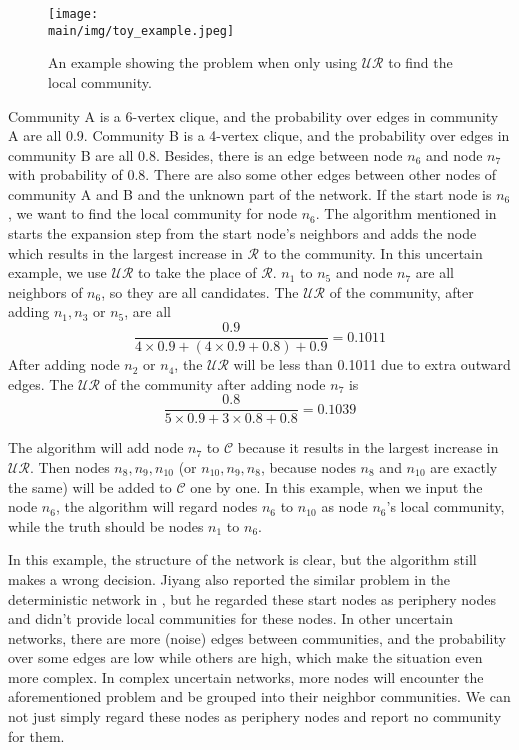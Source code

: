 \documentclass[\main/thesis.tex]{subfiles}
\begin{document}
\begin{figure}
\centering
\texttt{[image: \\main/img/toy\_example.jpeg]}
\caption{An example showing the problem when only using $\mathcal{UR}$ to find the local community.}
\label{problem_example}
\end{figure}

Community A is a 6-vertex clique, and the probability over edges in community A are all 0.9. Community B is a 4-vertex clique, and the probability over edges in community B are all 0.8. Besides, there is an edge between node $n_6$ and node $n_7$ with probability of 0.8. There are also some other edges between other nodes of community A and B and the unknown part of the network. If the start node is $n_6$, we want to find the local community for node $n_6$. The algorithm mentioned in \cite{clauset2005finding,chen2009detecting} starts the expansion step from the start node's neighbors and adds the node which results in the largest increase in $\mathcal{R}$ to the community. In this uncertain example, we use $\mathcal{UR}$ to take the place of $\mathcal{R}$. $n_1$ to $n_5$ and node $n_7$ are all neighbors of $n_6$, so they are all candidates. The $\mathcal{UR}$ of the community, after adding $n_1, n_3$ or $n_5$, are all 
\begin{equation}
\frac{0.9}{4\times0.9+(4\times0.9+0.8)+0.9}=0.1011
\label{value-after-add-135}
\end{equation}
After adding node $n_2$ or $n_4$, the $\mathcal{UR}$ will be less than 0.1011 due to extra outward edges. The $\mathcal{UR}$ of the community after adding node $n_7$ is 
\begin{equation}
\frac{0.8}{5\times0.9+3\times0.8+0.8}=0.1039
\end{equation}

The algorithm will add node $n_7$ to $\mathcal{C}$ because it results in the largest increase in $\mathcal{UR}$. Then nodes $n_8, n_9, n_{10}$ (or $n_{10}, n_9, n_{8}$, because nodes $n_8$ and $n_{10}$ are exactly the same) will be added to $\mathcal{C}$ one by one. In this example, when we input the node $n_6$, the algorithm will regard nodes $n_6$ to $n_{10}$ as node $n_6$'s local community, while the truth should be nodes $n_1$ to $n_6$.

In this example, the structure of the network is clear, but the algorithm still makes a wrong decision. Jiyang also reported the similar problem in the deterministic network in \cite{chen2009local}, but he regarded these start nodes as periphery nodes and didn't provide local communities for these nodes. In other uncertain networks, there are more (noise) edges between communities, and the probability over some edges are low while others are high, which make the situation even more complex. In complex uncertain networks, more nodes will encounter the aforementioned problem and be grouped into their neighbor communities. We can not just simply regard these nodes as periphery nodes and report no community for them.
\end{document}

